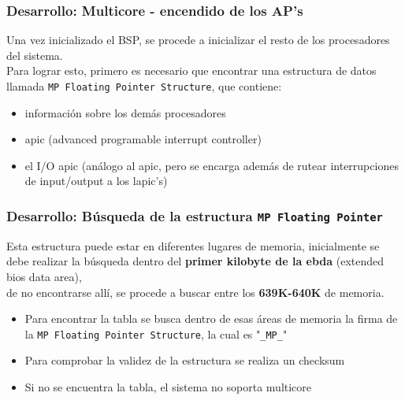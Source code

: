 \documentclass{beamer}
\begin{document}
\begin{frame}
\frametitle{Desarrollo: Multicore - encendido de los AP's}
Una vez inicializado el BSP, se procede a inicializar el resto de los procesadores del sistema.\\
\vspace{20pt}
Para lograr esto, primero es necesario que encontrar una estructura de datos llamada \texttt{MP Floating Pointer Structure}, que contiene:

\begin{itemize} \scriptsize
 \item información sobre los demás procesadores
 \item apic (advanced programable interrupt controller)
 \item el I/O apic (análogo al apic, pero se encarga además de rutear interrupciones de input/output a los lapic's)
\end{itemize}
\end{frame}

\begin{frame}
  \frametitle{Desarrollo: \small Búsqueda de la estructura \texttt{MP Floating Pointer}}
  Esta estructura puede estar en diferentes lugares de memoria, inicialmente se debe realizar la búsqueda dentro del \textbf{primer kilobyte de la ebda} (extended bios data area), \\
  de no encontrarse allí, se procede a buscar entre los \textbf{639K-640K} de memoria.\\
  \vspace{10pt}
  \begin{itemize}
   \item Para encontrar la tabla se busca dentro de esas áreas de memoria la firma de la \texttt{MP Floating Pointer Structure}, la cual es "\texttt{\_MP\_}"
  \item Para comprobar la validez de la estructura se realiza un checksum
  \item Si no se encuentra la tabla, el sistema no soporta multicore
  \end{itemize}
\end{frame}

\end{document}
